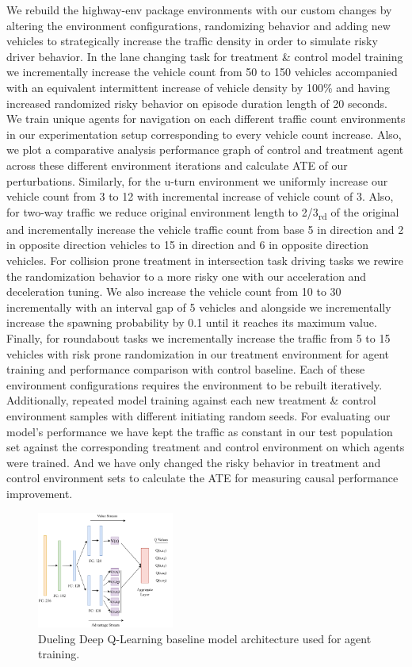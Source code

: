 \documentclass[a4, conference]{IEEEtran}
\begin{document}
    We rebuild the highway-env package environments with our custom changes by altering the environment configurations, randomizing behavior and adding new vehicles to strategically increase the traffic density in order to simulate risky driver behavior. In the lane changing task for treatment \& control model training we incrementally increase the vehicle count from 50 to 150 vehicles accompanied with an equivalent intermittent increase of vehicle density by 100\% and having increased randomized risky behavior on episode duration length of 20 seconds. We train unique agents for navigation on each different traffic count environments in our experimentation setup corresponding to every vehicle count increase. Also, we plot a comparative analysis performance graph of control and treatment agent across these different environment iterations and calculate ATE of our perturbations. Similarly, for the u-turn environment we uniformly increase our vehicle count from 3 to 12 with incremental increase of vehicle count of 3. Also, for two-way traffic we reduce original environment length to 2/3\textsubscript{rd} of the original and incrementally increase the vehicle traffic count from base 5 in direction and 2 in opposite direction vehicles to 15 in direction and 6 in opposite direction vehicles. For collision prone treatment in intersection task driving tasks we rewire the randomization behavior to a more risky one with our acceleration and deceleration tuning. We also increase the vehicle count from 10 to 30 incrementally with an interval gap of 5 vehicles and alongside we incrementally increase the spawning probability by 0.1 until it reaches its maximum value. Finally, for roundabout tasks we incrementally increase the traffic from 5 to 15 vehicles with risk prone randomization in our treatment environment for agent training and performance comparison with control baseline. Each of these environment configurations requires the environment to be rebuilt iteratively. Additionally, repeated model training against each new treatment \& control environment samples with different initiating random seeds. For evaluating our model's performance we have kept the traffic as constant in our test population set against the corresponding treatment and control environment on which agents were trained. And we have only changed the risky behavior in treatment and control environment sets to calculate the ATE for measuring causal performance improvement.

    \begin{figure}
        \centering
        \includegraphics[width=0.4\textwidth]{dueling-network-dqn.png}
        \caption{Dueling Deep Q-Learning baseline model architecture used for agent training.}
        \label{fig6}
    \end{figure}
\end{document}

